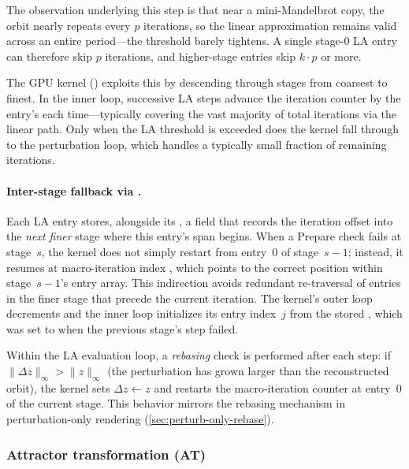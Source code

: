 The observation underlying this step is that near a mini-Mandelbrot copy, the orbit nearly
repeats every \(p\) iterations, so the linear approximation remains valid
across an entire period---the threshold barely tightens.  A single
stage-0 LA entry can therefore skip \(p\) iterations, and higher-stage
entries skip \(k\cdot p\) or more.

The GPU kernel () exploits this by descending through
stages from coarsest to finest.  In the inner loop,
successive LA steps advance the iteration counter by the entry's
 each time---typically covering the vast majority of
total iterations via the linear path.  Only when the LA threshold is
exceeded does the kernel fall through to the perturbation loop, which
handles a typically small fraction of remaining iterations.

\paragraph{Inter-stage fallback via .}
Each LA entry stores, alongside its , a field
 that records the iteration offset into the
\emph{next finer} stage where this entry's span begins.  When a
Prepare check fails at stage~\(s\), the kernel does not simply
restart from entry~0 of stage~\(s-1\); instead, it resumes at
macro-iteration index , which points to the
correct position within stage~\(s-1\)'s entry array.  This indirection avoids
redundant re-traversal of entries in the finer stage that precede the
current iteration.  The kernel's outer loop decrements
 and the inner loop initializes its entry index~\(j\)
from the stored , which was set to
 when the previous stage's step failed.

Within the LA evaluation loop, a \emph{rebasing} check is performed after
each step: if
\(\lVert \Delta z \rVert_\infty > \lVert z \rVert_\infty\)
(the perturbation has grown larger than the reconstructed orbit), the
kernel sets \(\Delta z \leftarrow z\) and restarts the macro-iteration
counter at entry~0 of the current stage.  This behavior mirrors the rebasing
mechanism in perturbation-only rendering (\cref{sec:perturb-only-rebase}).

\subsubsection{Attractor transformation (AT)}
\label{sec:attractor-transform}

